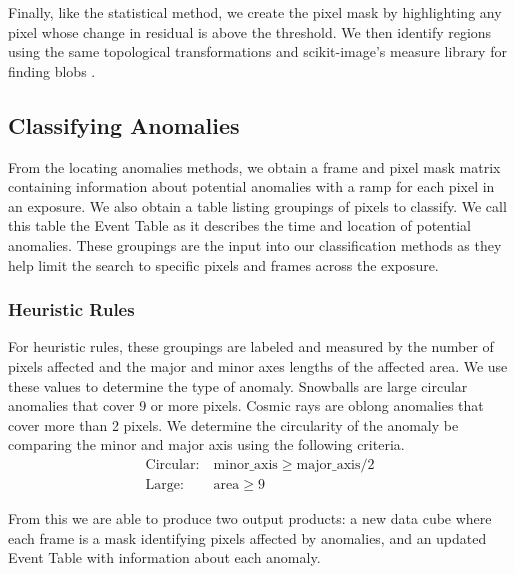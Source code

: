 Finally, like the statistical method, we create the pixel mask by highlighting any pixel whose change in residual is above the threshold.
We then identify regions using the same topological transformations and scikit-image's measure library for finding blobs \parencite{scikit-image}.

\subsection{Classifying Anomalies}
From the locating anomalies methods, we obtain a frame and pixel mask matrix containing information about potential anomalies with a ramp for each pixel in an exposure. 
We also obtain a table listing groupings of pixels to classify. We call this table the Event Table as it describes the time and location of potential anomalies. 
These groupings are the input into our classification methods as they help limit the search to specific pixels and frames across the exposure. 

\subsubsection{Heuristic Rules}
For heuristic rules, these groupings are labeled and measured by the number of pixels affected and the major and minor axes lengths of the affected area. 
We use these values to determine the type of anomaly.
Snowballs are large circular anomalies that cover 9 or more pixels.
Cosmic rays are oblong anomalies that cover more than 2 pixels. 
We determine the circularity of the anomaly be comparing the minor and major axis using the following criteria.
\begin{align*}
    \text{Circular:}\ &  \text{minor\_axis} \geq \text{major\_axis}/2 \\
    \text{Large:}\ & \text{area} \geq 9
\end{align*}

From this we are able to produce two output products: a new data cube where each frame is a mask identifying pixels affected by anomalies, and an updated Event Table with information about each anomaly. 

